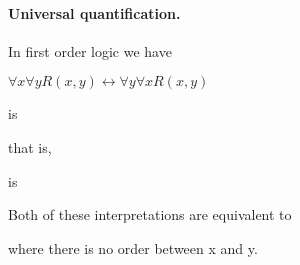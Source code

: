\paragraph{Universal quantification.}   In first order logic we have
\begin{display}
$\forall x \forall y R(x,y) \leftrightarrow \forall y
\forall x R(x,y)$
\end{display}
 is
\begin{display}
\end{display}
that is,
\begin{display}
\end{display}
  is
\begin{display}
\end{display} 
Both of these interpretations are equivalent to 
\begin{display}
\end{display}
where there is no order between x and y. 

